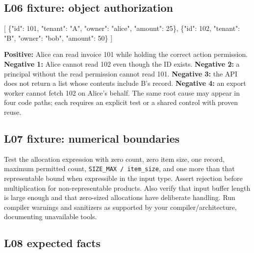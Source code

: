 \documentclass[
  letterpaper,
]{article}
\newenvironment{Shaded}{}{}
\newcommand{\DataTypeTok}[1]{\textcolor[rgb]{0.56,0.13,0.00}{#1}}
\newcommand{\DecValTok}[1]{\textcolor[rgb]{0.25,0.63,0.44}{#1}}
\newcommand{\FunctionTok}[1]{\textcolor[rgb]{0.02,0.16,0.49}{#1}}
\newcommand{\OtherTok}[1]{\textcolor[rgb]{0.00,0.44,0.13}{#1}}
\newcommand{\StringTok}[1]{\textcolor[rgb]{0.25,0.44,0.63}{#1}}
\begin{document}
\subsection{L06 fixture: object
authorization}\label{l06-fixture-object-authorization}

\begin{Shaded}
\begin{Highlighting}[]
\OtherTok{[}
  \FunctionTok{\{}\DataTypeTok{"id"}\FunctionTok{:} \DecValTok{101}\FunctionTok{,} \DataTypeTok{"tenant"}\FunctionTok{:} \StringTok{"A"}\FunctionTok{,} \DataTypeTok{"owner"}\FunctionTok{:} \StringTok{"alice"}\FunctionTok{,} \DataTypeTok{"amount"}\FunctionTok{:} \DecValTok{25}\FunctionTok{\}}\OtherTok{,}
  \FunctionTok{\{}\DataTypeTok{"id"}\FunctionTok{:} \DecValTok{102}\FunctionTok{,} \DataTypeTok{"tenant"}\FunctionTok{:} \StringTok{"B"}\FunctionTok{,} \DataTypeTok{"owner"}\FunctionTok{:} \StringTok{"bob"}\FunctionTok{,} \DataTypeTok{"amount"}\FunctionTok{:} \DecValTok{50}\FunctionTok{\}}
\OtherTok{]}
\end{Highlighting}
\end{Shaded}

\textbf{Positive:} Alice can read invoice 101 while holding the correct
action permission. \textbf{Negative 1:} Alice cannot read 102 even
though the ID exists. \textbf{Negative 2:} a principal without the read
permission cannot read 101. \textbf{Negative 3:} the API does not return
a list whose contents include B's record. \textbf{Negative 4:} an export
worker cannot fetch 102 on Alice's behalf. The same root cause may
appear in four code paths; each requires an explicit test or a shared
control with proven reuse.

\subsection{L07 fixture: numerical
boundaries}\label{l07-fixture-numerical-boundaries}

Test the allocation expression with zero count, zero item size, one
record, maximum permitted count, \texttt{SIZE\_MAX\ /\ item\_size}, and
one more than that representable bound when expressible in the input
type. Assert rejection before multiplication for non-representable
products. Also verify that input buffer length is large enough and that
zero-sized allocations have deliberate handling. Run compiler warnings
and sanitizers as supported by your compiler/architecture, documenting
unavailable tools.

\subsection{L08 expected facts}\label{l08-expected-facts}
\end{document}
